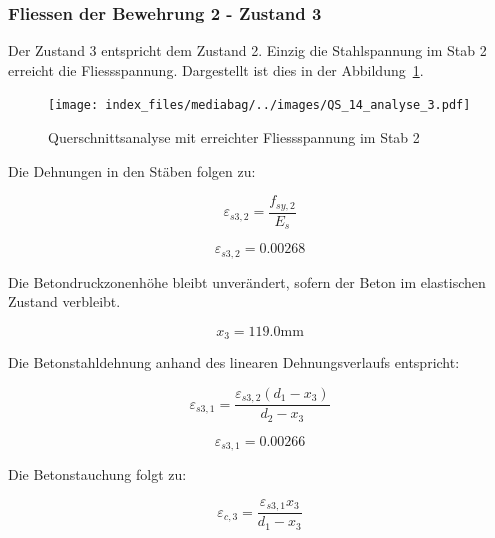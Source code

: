 \documentclass[
  12pt,
  letterpaper,
  egregdoesnotlikesansseriftitles]{scrreprt}
\begin{document}
\hypertarget{fliessen-der-bewehrung-2---zustand-3}{%
\subsubsection{Fliessen der Bewehrung 2 - Zustand
3}\label{fliessen-der-bewehrung-2---zustand-3}}

Der Zustand 3 entspricht dem Zustand 2. Einzig die Stahlspannung im Stab
2 erreicht die Fliessspannung. Dargestellt ist dies in der
Abbildung~\ref{fig-qs4_sv14}.

\begin{figure}[H]

{\centering \texttt{[image: index\_files/mediabag/../images/QS\_14\_analyse\_3.pdf]}

}

\caption{\label{fig-qs4_sv14}Querschnittsanalyse mit erreichter
Fliessspannung im Stab 2}

\end{figure}

Die Dehnungen in den Stäben folgen zu:

\begin{equation}\varepsilon_{s3,2} = \frac{f_{sy,2}}{E_{s}}\end{equation}

\begin{equation}\varepsilon_{s3,2} = 0.00268\end{equation}

Die Betondruckzonenhöhe bleibt unverändert, sofern der Beton im
elastischen Zustand verbleibt.

\begin{equation}x_{3} = 119.0 \text{mm}\end{equation}

Die Betonstahldehnung anhand des linearen Dehnungsverlaufs entspricht:

\begin{equation}\varepsilon_{s3,1} = \frac{\varepsilon_{s3,2} \left(d_{1} - x_{3}\right)}{d_{2} - x_{3}}\end{equation}

\begin{equation}\varepsilon_{s3,1} = 0.00266\end{equation}

Die Betonstauchung folgt zu:

\begin{equation}\varepsilon_{c,3} = \frac{\varepsilon_{s3,1} x_{3}}{d_{1} - x_{3}}\end{equation}
\end{document}
